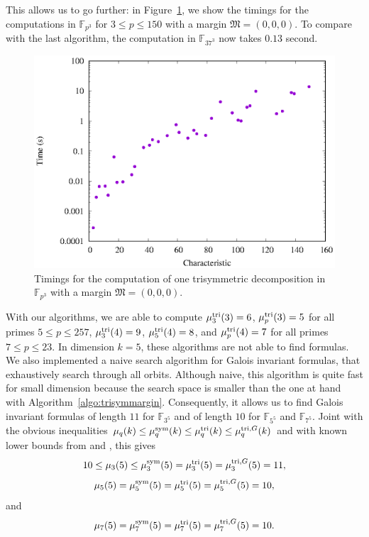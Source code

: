 This allows us to go further: in Figure~\ref{fig:fast-fixed-margin-0-0-0}, we
show the timings for the computations in $\mathbb{F}_{p^3}$ for $3\leq p\leq
150$ with a margin $\mathfrak M=(0,0,0)$. To compare with the last algorithm,
the computation in $\mathbb{F}_{37^3}$ now takes $0.13$ second.
\begin{figure}
  \centering
  \includegraphics{benchmarks/hypersymmetric/fast-fixed-margin-0-0-0.eps}
  \caption{Timings for the computation of one trisymmetric decomposition in
    $\mathbb{F}_{p^3}$ with a margin $\mathfrak M=(0,0,0)$.}
  \label{fig:fast-fixed-margin-0-0-0}
\end{figure}
With our algorithms, we are able to compute $\mu^{\textrm{tri}}_3(3)=6$,
$\mu^{\textrm{tri}}_p(3)=5$ for all primes $5\leq p\leq 257$,
$\mu^{\textrm{tri}}_3(4)=9$, $\mu^{\textrm{tri}}_5(4)=8$, and $\mu^{\textrm{tri}}_p(4)=7$ for all primes $7\leq p\leq 23$.
In dimension $k=5$, these algorithms are not able to find formulas.
We also implemented a naive search algorithm for Galois invariant formulas, that
exhaustively search through all orbits. Although naive, this algorithm is quite
fast for small dimension because the search space is smaller than the one at
hand with Algorithm~\ref{algo:trisymmargin}. Consequently, it allows
us to find Galois invariant formulas of length $11$ for $\mathbb{F}_{3^5}$ and
of length $10$ for $\mathbb{F}_{5^5}$ and $\mathbb{F}_{7^5}$.
Joint with the obvious inequalities
$\mu_q(k)\leq\mu^{\textrm{sym}}_q(k)\leq\mu^{\textrm{tri}}_q(k)\leq\mu^{\textrm{tri},G}_q(k)$ and with known lower
bounds from \cite[Thm. 2.2]{BCPRRR19} and \cite{BDEZ12},
this gives 
\[
  10\leq\mu_3(5)\leq\mu^{\textrm{sym}}_3(5)=\mu^{\textrm{tri}}_3(5)=\mu^{\textrm{tri},G}_3(5)=11,
\]
\[
\mu_5(5)=\mu^{\textrm{sym}}_5(5)=\mu^{\textrm{tri}}_5(5)=\mu^{\textrm{tri},G}_5(5)=10,
\]
and 
\[
  \mu_7(5)=\mu^{\textrm{sym}}_7(5)=\mu^{\textrm{tri}}_7(5)=\mu^{\textrm{tri},G}_7(5)=10.
\]
